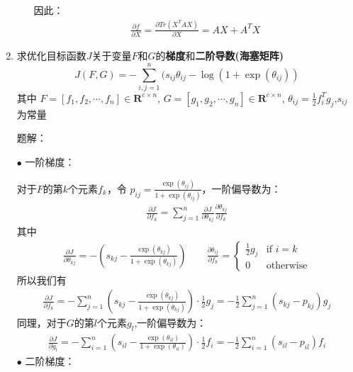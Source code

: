 \documentclass[UTF8]{ctexart}
\begin{document}
\begin{enumerate}
\begin{itemize}
			因此：
			\begin{align*}
				\frac{\partial f}{\partial X}=\frac{\partial Tr(X^TAX)}{\partial X} = AX + A^TX
			\end{align*}


		\end{itemize}


		\item 求优化目标函数$J$关于变量$F$和$G$的{\bf 梯度}和{\bf 二阶导数(海塞矩阵)}
		$$
		J(F,G)=-\sum\limits_{i,j=1}^n(s_{ij}\theta_{ij}-\log(1+\exp(\theta_{ij}))
		$$
		其中 $F=[f_1,f_2,\cdots,f_n]\in\mathbf{R}^{c\times n}$,     $G=[g_1,g_2,\cdots,g_n]\in\mathbf{R}^{c\times n}$, $\theta_{ij}=\frac{1}{2}f_i^Tg_j$,$s_{ij}$为常量

		题解：

		$\bullet$ 一阶梯度：

		对于$F$的第$k$个元素$f_k$，令 $p_{ij}=\frac {\exp (\theta_{ij})}{1+\exp (\theta_{ij})}$，一阶偏导数为：
		\begin{align*}
			\frac{\partial J}{\partial f_k}=\sum_{j=1}^n\frac{\partial J}{\partial\theta_{kj}}\frac{\partial\theta_{kj}}{\partial f_k}
		\end{align*}
		其中
		\begin{align*}
			\frac{\partial J}{\partial\theta_{kj}}=-(s_{kj}-\frac{\exp(\theta_{kj})}{1+\exp(\theta_{kj})}) \quad\quad \frac{\partial\theta_{ij}}{\partial f_k}=\begin{cases}\frac{1}{2}g_j&\text{if } i=k\\0&\text{otherwise}\end{cases}
		\end{align*}
		所以我们有
		\begin{align*}
			\frac{\partial J}{\partial f_k}=-\sum\limits_{j=1}^n\left(s_{kj}-\frac{\exp(\theta_{kj})}{1+\exp(\theta_{kj})}\right) \cdot \frac{1}{2}g_j = -\frac{1}{2}\sum\limits_{j=1}^n\left(s_{kj}-p_{kj}\right)g_j
		\end{align*}
		同理，对于$G$的第$l$个元素$g_l$,一阶偏导数为：
		\begin{align*}
			\frac{\partial J}{\partial g_l}=-\sum\limits_{i=1}^n\left(s_{il}-\frac{\exp(\theta_{il})}{1+\exp(\theta_{il})}\right) \cdot \frac{1}{2}f_i = -\frac{1}{2}\sum\limits_{i=1}^n\left(s_{il}-p_{il}\right)f_i
		\end{align*}
		$\bullet$ 二阶梯度：


\end{enumerate}
\end{document}
